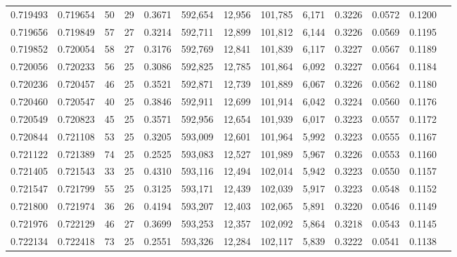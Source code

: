 \begin{tabular}{rrrrrrrrrrrrr}
0.719493 & 0.719654 &  50 &  29 &                                     0.3671 & 592,654 &  12,956 & 101,785 &   6,171 & 0.3226 & 0.0572 & 0.1200 \\
0.719656 & 0.719849 &  57 &  27 &                                     0.3214 & 592,711 &  12,899 & 101,812 &   6,144 & 0.3226 & 0.0569 & 0.1195 \\
0.719852 & 0.720054 &  58 &  27 &                                     0.3176 & 592,769 &  12,841 & 101,839 &   6,117 & 0.3227 & 0.0567 & 0.1189 \\
0.720056 & 0.720233 &  56 &  25 &                                     0.3086 & 592,825 &  12,785 & 101,864 &   6,092 & 0.3227 & 0.0564 & 0.1184 \\
0.720236 & 0.720457 &  46 &  25 &                                     0.3521 & 592,871 &  12,739 & 101,889 &   6,067 & 0.3226 & 0.0562 & 0.1180 \\
0.720460 & 0.720547 &  40 &  25 &                                     0.3846 & 592,911 &  12,699 & 101,914 &   6,042 & 0.3224 & 0.0560 & 0.1176 \\
0.720549 & 0.720823 &  45 &  25 &                                     0.3571 & 592,956 &  12,654 & 101,939 &   6,017 & 0.3223 & 0.0557 & 0.1172 \\
0.720844 & 0.721108 &  53 &  25 &                                     0.3205 & 593,009 &  12,601 & 101,964 &   5,992 & 0.3223 & 0.0555 & 0.1167 \\
0.721122 & 0.721389 &  74 &  25 &                                     0.2525 & 593,083 &  12,527 & 101,989 &   5,967 & 0.3226 & 0.0553 & 0.1160 \\
0.721405 & 0.721543 &  33 &  25 &                                     0.4310 & 593,116 &  12,494 & 102,014 &   5,942 & 0.3223 & 0.0550 & 0.1157 \\
0.721547 & 0.721799 &  55 &  25 &                                     0.3125 & 593,171 &  12,439 & 102,039 &   5,917 & 0.3223 & 0.0548 & 0.1152 \\
0.721800 & 0.721974 &  36 &  26 &                                     0.4194 & 593,207 &  12,403 & 102,065 &   5,891 & 0.3220 & 0.0546 & 0.1149 \\
0.721976 & 0.722129 &  46 &  27 &                                     0.3699 & 593,253 &  12,357 & 102,092 &   5,864 & 0.3218 & 0.0543 & 0.1145 \\
0.722134 & 0.722418 &  73 &  25 &                                     0.2551 & 593,326 &  12,284 & 102,117 &   5,839 & 0.3222 & 0.0541 & 0.1138 \\

\end{tabular}
